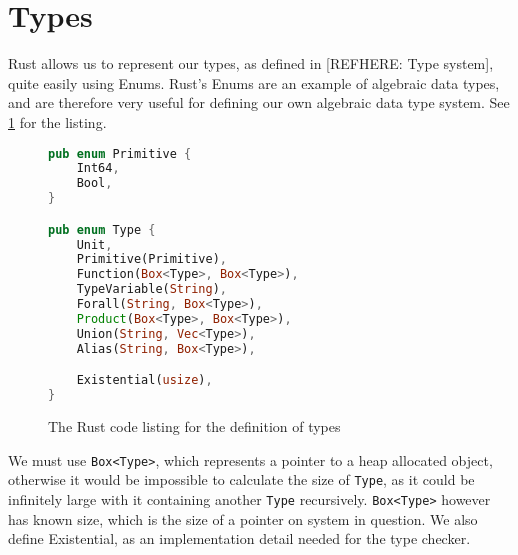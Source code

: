 \documentclass[
author=Kiran Sturt,
degree=BSc,
title=Implementing a Step by Step Evaluator for a Simple Functional Programming language,
unit=COMS30045,twoside]{dissertation}
\theoremstyle{definition}
\theoremstyle{break}
\theoremstyle{definition}
\begin{document}
\section{Types}
Rust allows us to represent our types, as defined in [REFHERE: Type system], quite easily using Enums. Rust's Enums are an example of algebraic data types, and are therefore very useful for defining our own algebraic data type system. See \ref{fig:type_lst} for the listing. 

\begin{figure}[t]
    \centering
    \begin{lstlisting}[language=Rust]
pub enum Primitive {
    Int64,
    Bool,
}

pub enum Type {
    Unit,
    Primitive(Primitive),
    Function(Box<Type>, Box<Type>),
    TypeVariable(String),
    Forall(String, Box<Type>),
    Product(Box<Type>, Box<Type>),
    Union(String, Vec<Type>),
    Alias(String, Box<Type>),

    Existential(usize),
}
    \end{lstlisting}
    \caption{The Rust code listing for the definition of types}
    \label{fig:type_lst}
\end{figure}

We must use \verb|Box<Type>|, which represents a pointer to a heap allocated object, otherwise it would be impossible to calculate the size of \verb|Type|, as it could be infinitely large with it containing another \verb|Type| recursively. \verb|Box<Type>| however has known size, which is the size of a pointer on system in question. We also define Existential, as an implementation detail needed for the type checker. 
\end{document}
